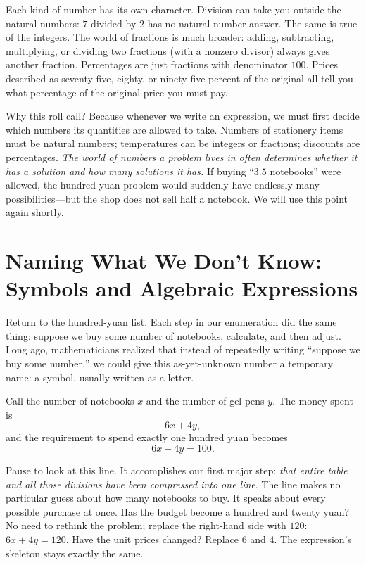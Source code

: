 Each kind of number has its own character. Division can take you outside the natural numbers: $7$ divided by $2$ has no natural-number answer. The same is true of the integers. The world of fractions is much broader: adding, subtracting, multiplying, or dividing two fractions (with a nonzero divisor) always gives another fraction. Percentages are just fractions with denominator $100$. Prices described as seventy-five, eighty, or ninety-five percent of the original all tell you what percentage of the original price you must pay.

Why this roll call? Because whenever we write an expression, we must first decide which numbers its quantities are allowed to take. Numbers of stationery items must be natural numbers; temperatures can be integers or fractions; discounts are percentages. \emph{The world of numbers a problem lives in often determines whether it has a solution and how many solutions it has.} If buying ``$3.5$ notebooks'' were allowed, the hundred-yuan problem would suddenly have endlessly many possibilities---but the shop does not sell half a notebook. We will use this point again shortly.

\section{Naming What We Don't Know: Symbols and Algebraic Expressions}

Return to the hundred-yuan list. Each step in our enumeration did the same thing: suppose we buy some number of notebooks, calculate, and then adjust. Long ago, mathematicians realized that instead of repeatedly writing ``suppose we buy some number,'' we could give this as-yet-unknown number a temporary name: a symbol, usually written as a letter.

Call the number of notebooks $x$ and the number of gel pens $y$. The money spent is
\[
6x+4y,
\]
and the requirement to spend exactly one hundred yuan becomes
\[
6x+4y=100.
\]

Pause to look at this line. It accomplishes our first major step: \emph{that entire table and all those divisions have been compressed into one line}. The line makes no particular guess about how many notebooks to buy. It speaks about every possible purchase at once. Has the budget become a hundred and twenty yuan? No need to rethink the problem; replace the right-hand side with $120$: $6x+4y=120$. Have the unit prices changed? Replace $6$ and $4$. The expression's skeleton stays exactly the same.


